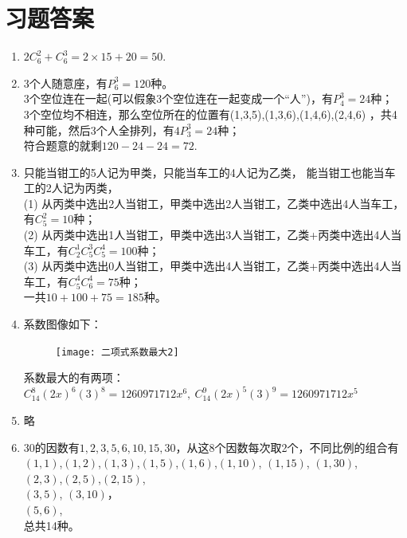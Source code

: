 \section{习题答案}
\begin{enumerate}[label={\textbf{\arabic*.}},leftmargin=
    \inteval{\myenumleftmargin}pt]
\item $ 2C_6^2+C_6^3=2\times 15+20=50 $.

\item 3个人随意座，有$ P_6^3=120 $种。\\
3个空位连在一起(可以假象3个空位连在一起变成一个“人”)，有$P_4^3=24$种；\\
3个空位均不相连，那么空位所在的位置有(1,3,5),(1,3,6),(1,4,6),(2,4,6)
，共4种可能，然后3个人全排列，有$4P_3^3=24$种；\\
符合题意的就剩$ 120-24-24=72$.

\item 只能当钳工的5人记为甲类，只能当车工的4人记为乙类，
能当钳工也能当车工的2人记为丙类，\\
(1) 从丙类中选出2人当钳工，甲类中选出2人当钳工，乙类中选出4人当车工，有$ C_5^2=10 $种；\\
(2) 从丙类中选出1人当钳工，甲类中选出3人当钳工，乙类+丙类中选出4人当车工，有$ C_2^1C_5^3C_5^4=100 $种；\\
(3) 从丙类中选出0人当钳工，甲类中选出4人当钳工，乙类+丙类中选出4人当车工，有$ C_5^4C_6^4=75 $种；\\
一共$10+100+75=185$种。

\item 系数图像如下：
\begin{figure}[H]
    \centering
    \texttt{[image: 二项式系数最大2]}
\end{figure}
系数最大的有两项：$ C_{14}^{8}(2x)^6(3)^8=1260971712x^{6},\ 
C_{14}^{9}(2x)^5(3)^9=1260971712x^{5} $

\item 略

\item 30的因数有$ 1,2,3,5,6,10,15,30 $，从这8个因数每次取2个，不同比例的组合有\\
$ (1,1) $,$ (1,2) $,$ (1,3) $,$ (1,5) $,$ (1,6) $,$(1,10)$,
$ (1,15) $, $(1,30)$,\\
$ (2,3) $,$(2,5)$,$(2,15)$,\\
$ (3,5) $, $(3,10)$，\\
$ (5,6) $,\\
总共14种。


\end{enumerate}
